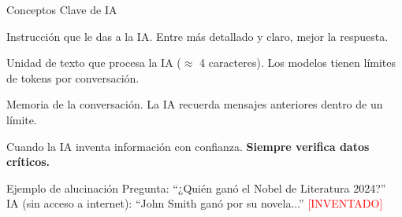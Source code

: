 \documentclass[aspectratio=169,xcolor={dvipsnames}]{beamer}
\newcommand{\herramienta}[1]{\textbf{\textcolor{naranjaUNSCH}{#1}}}
\begin{document}
	\begin{frame}{Conceptos Clave de IA}
		
		\begin{description}[style=nextline]
			\item[\herramienta{Prompt}] 
			Instrucción que le das a la IA. Entre más detallado y claro, mejor la respuesta.
			
			\item[\herramienta{Token}] 
			Unidad de texto que procesa la IA ($\approx$ 4 caracteres). Los modelos tienen límites de tokens por conversación.
			
			\item[\herramienta{Contexto}] 
			Memoria de la conversación. La IA recuerda mensajes anteriores dentro de un límite.
			
			\item[\herramienta{Alucinación}] 
			Cuando la IA inventa información con confianza. \textbf{Siempre verifica datos críticos.}
		\end{description}
		
		\vspace{0.5cm}
		
		\begin{alertblock}{Ejemplo de alucinación}
			Pregunta: ``¿Quién ganó el Nobel de Literatura 2024?''\\
			IA (sin acceso a internet): ``John Smith ganó por su novela...'' \textcolor{red}{[INVENTADO]}
		\end{alertblock}
		
	\end{frame}
	
\end{document}
